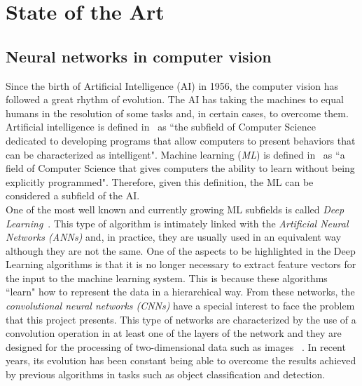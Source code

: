 \chapter{State of the Art}\label{cap.estadodelarte}
\setlength{\parindent}{0pt}
\section{Neural networks in computer vision}
Since the birth of Artificial Intelligence (AI) in 1956, the computer vision has followed a great rhythm of evolution. The AI has taking the machines to equal humans in the resolution of some tasks and, in certain cases, to overcome them.
Artificial intelligence is defined in~\cite{mccarthy2006proposal} as ``the subfield of Computer Science dedicated to developing programs that allow computers to present behaviors that can be characterized as intelligent". Machine learning (\textit{ML}) is defined in~\cite{samuel2000some} as ``a field of Computer Science that gives computers the ability to learn without being explicitly programmed". Therefore, given this definition, the ML can be considered a subfield of the AI.\\
One of the most well known and currently growing ML subfields is called \textit{Deep Learning}~\cite{deng2014deep}. This type of algorithm is intimately linked with the \textit{Artificial Neural Networks (ANNs)} and, in practice, they are usually used in an equivalent way although they are not the same. One of the aspects to be highlighted in the Deep Learning algorithms is that it is no longer necessary to extract feature vectors for the input to the machine learning system. This is because these algorithms ``learn" how to represent the data in a hierarchical way. From these networks, the \textit{convolutional neural networks (CNNs)} have a special interest to face the problem that this project presents. This type of networks are characterized by the use of a convolution operation in at least one of the layers of the network and they are designed for the processing of two-dimensional data such as images ~\cite{liu2015implementation}. In recent years, its evolution has been constant being able to overcome the results achieved by previous algorithms in tasks such as object classification and detection.\\

